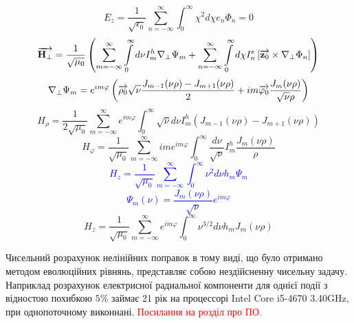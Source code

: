 %
\begin{equation*} 
E_z = \frac{1}{\sqrt{\epsilon_0}} \sum_{n=-\infty}^{\infty}
\int_0^\infty \chi^2 d \chi e_n \Phi_n = 0
\end{equation*}
%
\textcolor{blue} { \begin{equation*}
\overrightarrow{\mathbf H_\perp} = \frac{1}{\sqrt{\mu_0}} \left( 
\sum \limits_{m=-\infty}^{\infty} \int \limits_{0}^{\infty} d \nu
I_m^h \nabla_\perp \Psi_m + \sum \limits_{n=-\infty}^{\infty}
\int \limits_{0}^{\infty} d \chi I_n^e 
\left[ \overrightarrow{\mathbf z_0} \times \nabla_\perp \Phi_n \right] \right)
\end{equation*} }
%
\textcolor{blue} { \begin{equation*} \begin{aligned}
\nabla_\perp \Psi_m = e^{i m \varphi} \left( \overrightarrow{\mathbf \rho_0} 
\sqrt{\nu} \frac{ J_{m-1}(\nu \rho) - J_{m+1}(\nu \rho) }{2} +
i m \overrightarrow{\mathbf \varphi_0} \frac{J_m(\nu \rho)}{\sqrt{\nu} \rho} \right)
\end{aligned} \end{equation*} }
%
\begin{equation*}
H_\rho = \frac{1}{2 \sqrt{\mu_0}} \sum_{m=-\infty}^{\infty} 
e^{im\varphi} \int_{0}^{\infty} \sqrt{\nu} d \nu
I_m^h \left( J_{m-1}(\nu \rho) - J_{m+1}(\nu \rho) \right)
\end{equation*}
%
\begin{equation*}
H_\varphi = \frac{1}{\sqrt{\mu_0}} \sum_{m=-\infty}^{\infty} 
i m e^{im\varphi} \int_{0}^{\infty} \frac{d \nu}{\sqrt{\nu}}
I_m^h \frac{J_m(\nu \rho)}{\rho}
\end{equation*}
%
\textcolor{blue} { \begin{equation*} 
H_z = \frac{1}{\sqrt{\mu_0}} \sum_{m=-\infty}^{\infty}
\int_0^\infty \nu^2 d \nu h_m \Psi_m
\end{equation*} }
%
\textcolor{blue} { \begin{equation*} 
\Psi_m (\nu) = \frac{J_m(\nu \rho)}{\sqrt{\nu}} e^{i m \varphi}
\end{equation*} }
%
\begin{equation*} 
H_z = \frac{1}{\sqrt{\mu_0}} \sum_{m=-\infty}^{\infty}
e^{i m \varphi} \int_0^\infty \nu^{3/2} d \nu h_m 
J_m(\nu \rho)
\end{equation*}

Чисельний розрахунок нелінійних поправок в тому виді, що було отримано методом 
еволюційних рівнянь, представляє собою нездійсненну чисельну задачу. Наприклад 
розрахунок електрисної радиальної компоненти для однієї події з відностою 
похибкою $ 5\% $ займає 21 рік на процессорі Intel Core i5-4670 3.40GHz, 
при однопоточному виконнані. \textcolor{red} { Посилання на розділ про ПО. }

